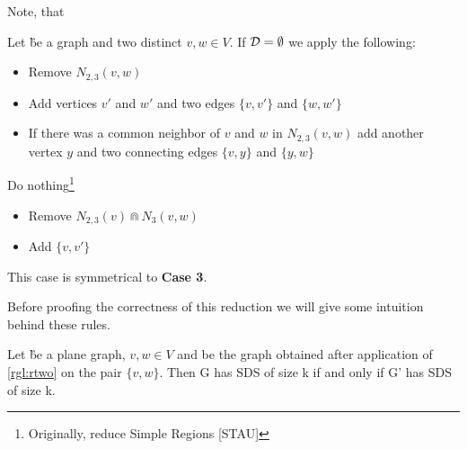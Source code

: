     Note, that 
\begin{rgl}\label{rgl:rtwo}
    Let \G be a graph and two distinct $v,w \in V$. If $\mathcal{D} = \emptyset$ we apply the following:
    \begin{caseof}

        \begin{itemize}
            \item Remove $N_{2,3}(v,w)$
            \item Add vertices $v'$ and $w'$ and two edges $\{v, v'\}$ and $\{w, w'\}$
            \item If there was a common neighbor of $v$ and $w$ in $N_{2,3}(v,w)$ add another vertex $y$ and two connecting edges  $\{v, y\}$ and $\{y, w\}$
        \end{itemize}
        Do nothing\footnote{Originally, reduce Simple Regions [STAU]}


        \begin{itemize}
            \item Remove $N_{2,3}(v) \Cap N_3(v,w)$
            \item Add $\{v, v'\}$ 
        \end{itemize}

         This case is symmetrical to \textbf{Case 3}. 
    \end{caseof}
\end{rgl}

Before proofing the correctness of this reduction we will give some intuition behind these rules.

\begin{lemma}
    Let \G be a plane graph, $v, w \in V$ and \GB be the graph obtained after application of \cref{rgl:rtwo} on the pair $\{v, w\}$. Then G has SDS of size k if and only if G' has SDS of size k.
\end{lemma}

